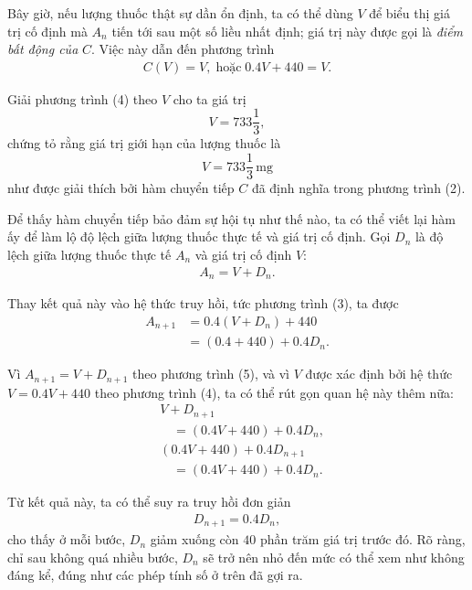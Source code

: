 {\begin{description}
      Bây giờ, nếu lượng thuốc thật sự dần ổn định, ta có thể dùng $V$ để biểu thị giá trị cố định mà $A_n$ tiến tới sau một số liều nhất định; giá trị này được gọi là \emph{điểm bất động của} $C$. Việc này dẫn đến phương trình
      \begin{align*}
        C(V)=V, \; \text{hoặc} \; 0.4V+440=V. \tag{4}
      \end{align*}

      Giải phương trình (4) theo $V$ cho ta giá trị 
      $$
        V=733\frac{1}{3},
      $$
      chứng tỏ rằng giá trị giới hạn của lượng thuốc là\vspace{\baselineskip}
      $$
        V=733\frac{1}{3} \, \text{mg}
      $$      
      như được giải thích bởi hàm chuyển tiếp $C$ đã định nghĩa trong phương trình (2).

      Để thấy hàm chuyển tiếp bảo đảm sự hội tụ như thế nào, ta có thể viết lại hàm ấy để làm lộ độ lệch giữa lượng thuốc thực tế và giá trị cố định. Gọi $D_n$ là độ lệch giữa lượng thuốc thực tế $A_n$ và giá trị cố định $V$:
      \begin{align*}
          A_n=V+D_n. \tag{5}
      \end{align*}

      Thay kết quả này vào hệ thức truy hồi, tức phương trình (3), ta được
      \begin{align*}
        A_{n+1}
          &=0.4(V+D_n)+440\\
          &=(0.4+440)+0.4D_n. \tag{6}
      \end{align*} 

      Vì $A_{n+1}=V+D_{n+1}$ theo phương trình (5), và vì $V$ được xác định bởi hệ thức $V=0.4V+440$ theo phương trình (4), ta có thể rút gọn quan hệ này thêm nữa:
      \begin{align*}
        &V+D_{n+1} \\
        &\quad =(0.4V+440)+0.4D_n, \\
        & (0.4V+440)+0.4D_{n+1} \\
        &\quad =(0.4V+440)+0.4D_n.  
      \end{align*}

      Từ kết quả này, ta có thể suy ra truy hồi đơn giản
      \begin{align*}
          D_{n+1}=0.4D_n, \tag{7}
      \end{align*}
      cho thấy ở mỗi bước, $D_n$ giảm xuống còn $40$ phần trăm giá trị trước đó. Rõ ràng, chỉ sau không quá nhiều bước, $D_n$ sẽ trở nên nhỏ đến mức có thể xem như không đáng kể, đúng như các phép tính số ở trên đã gợi ra.
    \end{description}

}

